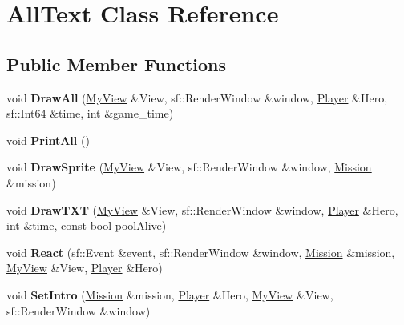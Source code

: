 \hypertarget{class_all_text}{}\section{All\+Text Class Reference}
\label{class_all_text}
\subsection*{Public Member Functions}
\begin{DoxyCompactItemize}
\item 
\mbox{\label{class_all_text_a4d058644cbec9fc23c67338783fadcc4}} 
void {\bfseries Draw\+All} (\hyperlink{class_my_view}{My\+View} \&View, sf\+::\+Render\+Window \&window, \hyperlink{class_player}{Player} \&Hero, sf\+::\+Int64 \&time, int \&game\+\_\+time)
\item 
\mbox{\label{class_all_text_a3793474872c36d680786ae9833753a50}} 
void {\bfseries Print\+All} ()
\item 
\mbox{\label{class_all_text_a9f3061467d6b40970e93614aa9af2385}} 
void {\bfseries Draw\+Sprite} (\hyperlink{class_my_view}{My\+View} \&View, sf\+::\+Render\+Window \&window, \hyperlink{class_mission}{Mission} \&mission)
\item 
\mbox{\label{class_all_text_abbb55cd59047ede43ffd6f327c3e90ae}} 
void {\bfseries Draw\+T\+XT} (\hyperlink{class_my_view}{My\+View} \&View, sf\+::\+Render\+Window \&window, \hyperlink{class_player}{Player} \&Hero, int \&time, const bool pool\+Alive)
\item 
\mbox{\label{class_all_text_a1a346e4a4891736b8921e5e09b4fecbc}} 
void {\bfseries React} (sf\+::\+Event \&event, sf\+::\+Render\+Window \&window, \hyperlink{class_mission}{Mission} \&mission, \hyperlink{class_my_view}{My\+View} \&View, \hyperlink{class_player}{Player} \&Hero)
\item 
\mbox{\label{class_all_text_a160fde29aaa4c29f9d461b5e30c7d118}} 
void {\bfseries Set\+Intro} (\hyperlink{class_mission}{Mission} \&mission, \hyperlink{class_player}{Player} \&Hero, \hyperlink{class_my_view}{My\+View} \&View, sf\+::\+Render\+Window \&window)
\item 
\mbox{\label{class_all_text_a300d5aa5747761fbf059c31daaf75521}} 

\end{DoxyCompactItemize}
